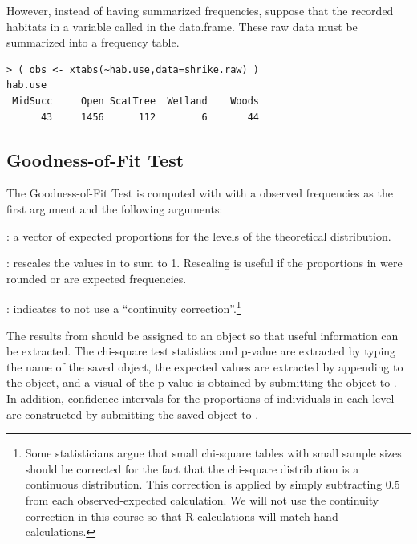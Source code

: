 \documentclass[10pt,openany]{book}\usepackage[]{graphicx}\usepackage[]{color}
\makeatletter
\newenvironment{kframe}{%
 \def\at@end@of@kframe{}%
 \ifinner\ifhmode%
  \def\at@end@of@kframe{\end{minipage}}%
  \begin{minipage}{\columnwidth}%
 \fi\fi%
 \def\FrameCommand##1{\hskip\@totalleftmargin \hskip-\fboxsep
 \colorbox{shadecolor}{##1}\hskip-\fboxsep
     \hskip-\linewidth \hskip-\@totalleftmargin \hskip\columnwidth}%
 \MakeFramed {\advance\hsize-\width
   \@totalleftmargin\z@ \linewidth\hsize
   \@setminipage}}%
 {\par\unskip\endMakeFramed%
 \at@end@of@kframe}
\newenvironment{knitrout}{}{} %
\makeatother
\begin{document}
However, instead of having summarized frequencies, suppose that the recorded habitats in a variable called  in the  data.frame. These raw data must be summarized into a frequency table.
\begin{knitrout}
\color{fgcolor}\begin{kframe}
\begin{verbatim}
> ( obs <- xtabs(~hab.use,data=shrike.raw) )
hab.use
 MidSucc     Open ScatTree  Wetland    Woods 
      43     1456      112        6       44 
\end{verbatim}
\end{kframe}
\end{knitrout}



\subsection{Goodness-of-Fit Test}
\vspace{-12pt}
The Goodness-of-Fit Test is computed with  with a observed frequencies as the first argument and the following arguments:
\begin{Itemize}
  \item {}: a vector of expected proportions for the levels of the theoretical distribution.
  \item {}: rescales the values in  to sum to 1.  Rescaling is useful if the proportions in  were rounded or are expected frequencies.
  \item {}: indicates to not use a ``continuity correction''.\footnote{Some statisticians argue that small chi-square tables with small sample sizes should be corrected for the fact that the chi-square distribution is a continuous distribution.  This correction is applied by simply subtracting 0.5 from each observed-expected calculation. We will not use the continuity correction in this course so that R calculations will match hand calculations.}
\end{Itemize}

The results from  should be assigned to an object so that useful information can be extracted. The chi-square test statistics and p-value are extracted by typing the name of the saved object, the expected values are extracted by appending  to the object, and a visual of the p-value is obtained by submitting the object to . In addition, confidence intervals for the proportions of individuals in each level are constructed by submitting the saved object to .
\end{document}
